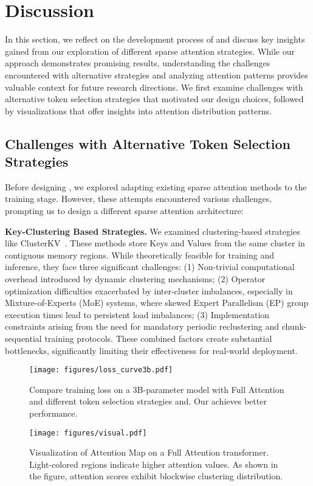 \section{Discussion}
In this section, we reflect on the development process of \method{} and discuss key insights gained from our exploration of different sparse attention strategies. While our approach demonstrates promising results, understanding the challenges encountered with alternative strategies and analyzing attention patterns provides valuable context for future research directions. We first examine challenges with alternative token selection strategies that motivated our design choices, followed by visualizations that offer insights into attention distribution patterns.

\subsection{Challenges with Alternative Token Selection Strategies}
\label{app:challenge}
Before designing \method{}, we explored adapting existing sparse attention methods to the training stage. However, these attempts encountered various challenges, prompting us to design a different sparse attention architecture:

\textbf{Key-Clustering Based Strategies.} 
We examined clustering-based strategies like ClusterKV~\citep{clusterkv}. These methods store Keys and Values from the same cluster in contiguous memory regions. While theoretically feasible for training and inference, they face three significant challenges: (1) Non-trivial computational overhead introduced by dynamic clustering mechanisms; (2) Operator optimization difficulties exacerbated by inter-cluster imbalances, especially in Mixture-of-Experts (MoE) systems, where skewed Expert Parallelism (EP) group execution times lead to persistent load imbalances; (3) Implementation constraints arising from the need for mandatory periodic reclustering and chunk-sequential training protocols. These combined factors create substantial bottlenecks, significantly limiting their effectiveness for real-world deployment.
\begin{figure}[t]
    \centering
    \begin{minipage}{0.52\textwidth}
        \centering
        \texttt{[image: figures/loss\_curve3b.pdf]}
        \caption{Compare training loss on a 3B-parameter model with Full Attention and different token selection strategies and. Our \method{} achieves better performance.}
        \label{fig:losscurve3b}
    \end{minipage}
    \hfill
    \begin{minipage}{0.44\textwidth}
        \centering
        \texttt{[image: figures/visual.pdf]}
        \caption{Visualization of Attention Map on a Full Attention transformer. Light-colored regions indicate higher attention values. As shown in the figure, attention scores exhibit blockwise clustering distribution.}
        \label{fig:visual}
    \end{minipage}
\end{figure}

